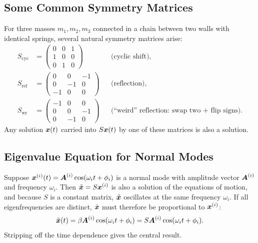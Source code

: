 \subsection{Some Common Symmetry Matrices}

\begin{example}
For three masses $m_1, m_2, m_3$ connected in a chain between two walls with identical springs, several natural symmetry matrices arise:
\begin{align}
    S_{\mathrm{cyc}} &= \begin{pmatrix} 0 & 0 & 1 \\ 1 & 0 & 0 \\ 0 & 1 & 0 \end{pmatrix}
    & &\text{(cyclic shift)}, \\
    S_{\mathrm{ref}} &= \begin{pmatrix} 0 & 0 & -1 \\ 0 & -1 & 0 \\ -1 & 0 & 0 \end{pmatrix}
    & &\text{(reflection)}, \\
    S_{\mathrm{wr}} &= \begin{pmatrix} -1 & 0 & 0 \\ 0 & 0 & -1 \\ 0 & -1 & 0 \end{pmatrix}
    & &\text{(``weird'' reflection: swap two + flip signs)}.
\end{align}
Any solution $\bm{x}(t)$ carried into $S\bm{x}(t)$ by one of these matrices is also a solution.
\end{example}

\subsection{Eigenvalue Equation for Normal Modes}

Suppose $\lvect{x}^{(i)}(t) = \vect{A}^{(i)} \cos(\omega_i t + \phi_i)$ is a normal mode with amplitude vector $\vect{A}^{(i)}$ and frequency $\omega_i$. Then $\tilde{\bm{x}} = S \bm{x}^{(i)}$ is also a solution of the equations of motion, and because $S$ is a constant matrix, $\tilde{\bm{x}}$ oscillates at the same frequency $\omega_i$. If all eigenfrequencies are distinct, $\tilde{\bm{x}}$ must therefore be proportional to $\bm{x}^{(i)}$:
\begin{equation}
    \tilde{\lvect{x}}(t) = \beta \vect{A}^{(i)} \cos(\omega_i t + \phi_i)
    = S \vect{A}^{(i)} \cos(\omega_i t + \phi_i).
\end{equation}
Stripping off the time dependence gives the central result.

